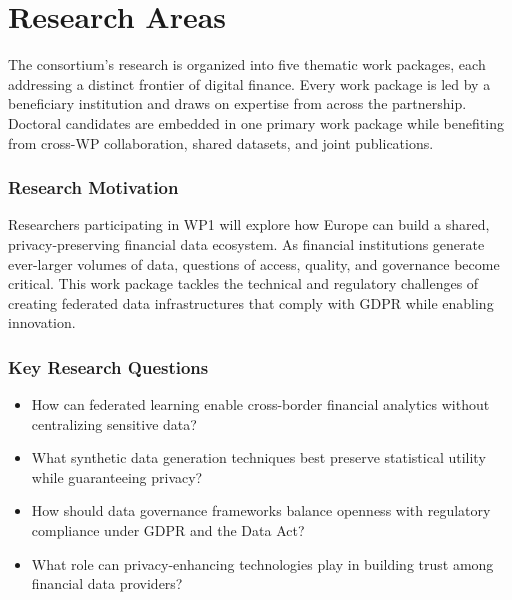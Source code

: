 \chapter{Research Areas}
\label{ch:research-wps}

The consortium's research is organized into five thematic work packages, each
addressing a distinct frontier of digital finance.  Every work package is led by
a beneficiary institution and draws on expertise from across the partnership.
Doctoral candidates are embedded in one primary work package while benefiting
from cross-WP collaboration, shared datasets, and joint publications.


\subsection*{Research Motivation}

Researchers participating in WP1 will explore how Europe can build a shared,
privacy-preserving financial data ecosystem.  As financial institutions generate
ever-larger volumes of data, questions of access, quality, and governance become
critical.  This work package tackles the technical and regulatory challenges of
creating federated data infrastructures that comply with GDPR while enabling
innovation.

\subsection*{Key Research Questions}
\begin{itemize}[nosep]
  \item How can federated learning enable cross-border financial analytics
        without centralizing sensitive data?
  \item What synthetic data generation techniques best preserve statistical
        utility while guaranteeing privacy?
  \item How should data governance frameworks balance openness with regulatory
        compliance under GDPR and the Data Act?
  \item What role can privacy-enhancing technologies play in building trust among
        financial data providers?
\end{itemize}

